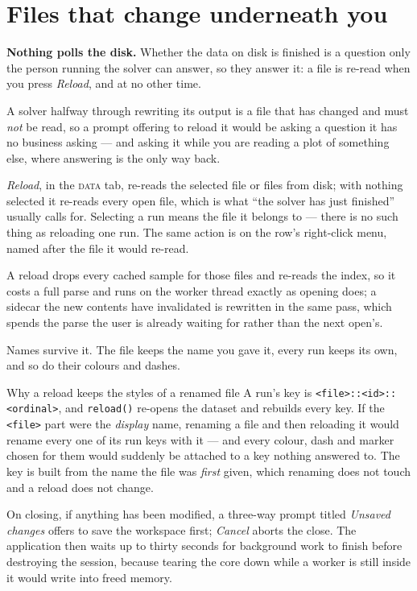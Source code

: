\documentclass[11pt,a4paper,oneside]{report}
\newcommand{\code}[1]{\texttt{#1}}
\newcommand{\tab}[1]{\textsc{#1}}
\begin{document}
\section{Files that change underneath you}
\label{sec:reload}

\textbf{Nothing polls the disk.} Whether the data on disk is finished is a
question only the person running the solver can answer, so they answer it: a
file is re-read when you press \emph{Reload}, and at no other time.

A solver halfway through rewriting its output is a file that has changed and
must \emph{not} be read, so a prompt offering to reload it would be asking a
question it has no business asking --- and asking it while you are reading a
plot of something else, where answering is the only way back.

\emph{Reload}, in the \tab{data} tab, re-reads the selected file or files from
disk; with nothing selected it re-reads every open file, which is what ``the
solver has just finished'' usually calls for. Selecting a run means the file it
belongs to --- there is no such thing as reloading one run. The same action is
on the row's right-click menu, named after the file it would re-read.

A reload drops every cached sample for those files and re-reads the index, so
it costs a full parse and runs on the worker thread exactly as opening does; a
sidecar the new contents have invalidated is rewritten in the same pass, which
spends the parse the user is already waiting for rather than the next open's.

Names survive it. The file keeps the name you gave it, every run keeps its own,
and so do their colours and dashes.

\begin{aoenote}{Why a reload keeps the styles of a renamed file}
A run's key is \code{<file>::<id>::<ordinal>}, and \code{reload()} re-opens the
dataset and rebuilds every key. If the \code{<file>} part were the
\emph{display} name, renaming a file and then reloading it would rename every
one of its run keys with it --- and every colour, dash and marker chosen for
them would suddenly be attached to a key nothing answered to. The key is
built from the name the file was \emph{first} given, which renaming does not
touch and a reload does not change.
\end{aoenote}

On closing, if anything has been modified, a three-way prompt titled
\emph{Unsaved changes} offers to save the workspace first; \emph{Cancel} aborts
the close. The application then waits up to thirty seconds for background work
to finish before destroying the session, because tearing the core down while a
worker is still inside it would write into freed memory.
\end{document}
